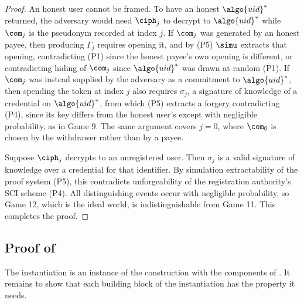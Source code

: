 \begin{proof}
An honest user cannot be framed. To have an honest $\algo{uid}^*$ returned, the
adversary would need $\ciph_j$ to decrypt to $\algo{uid}^*$ while $\com_j$ is
the pseudonym recorded at index $j$. If $\com_j$ was generated by an honest
payee, then producing $\Gamma_j$ requires opening it, and by (P5) $\simu$
extracts that opening, contradicting (P1) since the honest payee's own opening
is different, or contradicting hiding of $\com_j$ since $\algo{uid}^*$ was drawn
at random (P1). If $\com_j$ was instead supplied by the adversary as a commitment to
$\algo{uid}^*$, then spending the token at index $j$ also requires $\sigma_j$, a
signature of knowledge of a credential on $\algo{uid}^*$, from which (P5)
extracts a forgery contradicting (P4), since its key differs from the honest
user's except with negligible probability, as in Game 9. The same argument covers $j = 0$, where
$\com_0$ is chosen by the withdrawer rather than by a payee.

Suppose $\ciph_j$ decrypts to an unregistered user. Then $\sigma_j$ is a valid
signature of knowledge over a credential for that identifier. By simulation
extractability of the proof system (P5), this contradicts unforgeability of the
registration authority's SCI scheme (P4). All distinguishing events occur with negligible probability, so
Game 12, which is the ideal world, is indistinguishable from Game 11. This
completes the proof.

\end{proof}


\subsection{Proof of }\label{sec:offline-proof-2}

The instantiation is an instance of the
construction with the components of . It remains to show that each building block of the
instantiation has the property it needs.

